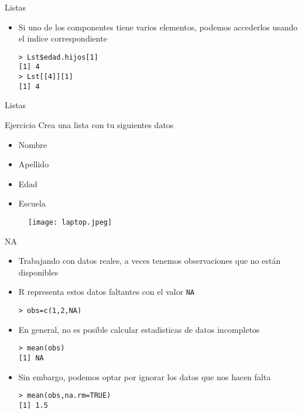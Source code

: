 \documentclass{beamer}
\begin{document}
\begin{frame}[fragile]{Listas}
\begin{itemize}
\item Si uno de los componentes tiene varios elementos, podemos accederlos usando el indice correspondiente
\begin{verbatim}
> Lst$edad.hijos[1]
[1] 4
> Lst[[4]][1]
[1] 4
\end{verbatim}
\end{itemize}
\end{frame}

\begin{frame}[fragile]{Listas}
\begin{block}{Ejercicio}
Crea una lista con tu siguientes datos
\begin{itemize}
\item Nombre
\item Apellido
\item Edad
\item Escuela
\end{itemize}
\end{block}
\begin{figure}[H]
\centering
\texttt{[image: laptop.jpeg]}
\end{figure}
\end{frame}

\begin{frame}[fragile]{NA}
\begin{itemize}
\item Trabajando con datos reales, a veces tenemos observaciones que no están disponibles
\item R representa estos datos faltantes con el valor \verb=NA=
\begin{verbatim}
> obs=c(1,2,NA)
\end{verbatim}
\item En general, no es posible calcular estadisticas de datos incompletos
\begin{verbatim}
> mean(obs)
[1] NA
\end{verbatim}
\item Sin embargo, podemos optar por ignorar los datos que nos hacen falta
\begin{verbatim}
> mean(obs,na.rm=TRUE)
[1] 1.5
\end{verbatim}
\end{itemize}
\end{frame}
\end{document}
